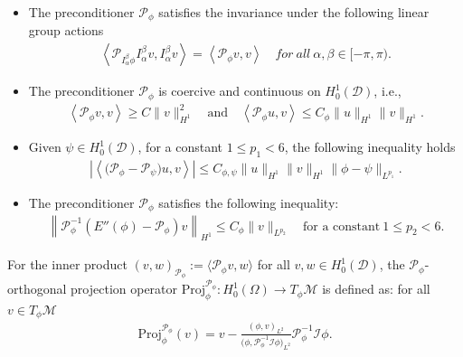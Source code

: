 \documentclass[preprint,3p]{elsarticle}
\begin{document}
\smallskip

\begin{itemize}%
	\item[$(i)$] {The preconditioner} $\mathcal{P}_{\phi}$ satisfies the invariance under the following linear group actions
	\begin{align*}
		\left\langle \mathcal{P}_{I_{\alpha}^{\beta}\phi}I_{\alpha}^{\beta}v,I_{\alpha}^{\beta}v\right\rangle=\left\langle \mathcal{P}_{\phi}v,v\right\rangle \quad for\ all\ \alpha,\beta\in[-\pi, \pi). 
	\end{align*}
	\item[$(ii)$] {The preconditioner} $\mathcal{P}_{\phi}$ is coercive and continuous on $H_0^1(\mathcal{D})$, i.e.,
	\begin{align*}
		\left\langle  \mathcal{P}_{\phi}v,v\right\rangle\ge C\|v\|^2_{H^1}\quad\text{and}\quad\left\langle \mathcal{P}_{\phi}u,v\right\rangle\le C_{\phi}\|u\|_{H^1}\|v\|_{H^1}.
	\end{align*}
	\item[$(iii)$] Given $\psi\in H_0^1(\mathcal{D})$, for a constant {$1\le p_1<6$}, the following inequality holds
	\begin{align*}
		\left|\left\langle \big(\mathcal{P}_{\phi}-\mathcal{P}_{\psi}\big)u,v\right\rangle\right|\le C_{\phi,\psi}\|u\|_{H^1}\|v\|_{H^1}\|\phi-\psi\|_{L^{p_1}}.
	\end{align*}
	\item[$(iv)$] {The preconditioner} $\mathcal{P}_{\phi}$ satisfies the following inequality:
	\begin{align*}
		\left\|\mathcal{P}_{\phi}^{-1}\left(E''(\phi)-\mathcal{P}_{\phi}\right)v\right\|_{H^1}\le C_{\phi}\|v\|_{L^{p_2}} \quad \text{for a constant}\ {1\le p_2<6}.
	\end{align*}
\end{itemize}

For the inner product {$(v, w)_{\mathcal{P}_{\phi}} := \langle \mathcal{P}_{\phi} v, w \rangle$ for all $v,w\in H_0^1(\mathcal{D})$}, the $\mathcal{P}_{\phi}$-orthogonal projection operator $\text{Proj}^{\mathcal{P}_{\phi}}_{\phi}: H_0^1(\Omega)\to T_{\phi}\mathcal{M}$ is defined as: for all $v\in T_{\phi}\mathcal{M}$
\begin{align}\label{Proj-P}
	\text{Proj}_{\phi}^{\mathcal{P}_{\phi}}(v)=v-\frac{(\phi,v)_{L^2}}{\big(\phi,\mathcal{P}_{\phi}^{-1}\mathcal{I}\phi\big)_{L^2}}\mathcal{P}_{\phi}^{-1}\mathcal{I}\phi.
\end{align}
\end{document}
